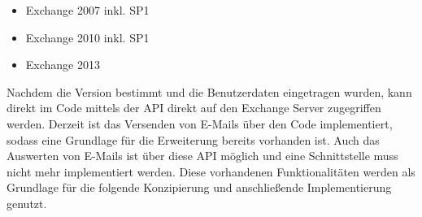 \begin{itemize}[topsep=-0.5\parskip]
\item Exchange 2007 inkl. SP1
\item  Exchange 2010 inkl. SP1
\item  Exchange 2013 
\end{itemize}

\noindent
Nachdem die Version bestimmt und die Benutzerdaten eingetragen wurden, kann direkt im Code mittels der API direkt auf den Exchange Server zugegriffen werden. Derzeit ist das Versenden von E-Mails über den Code implementiert, sodass eine Grundlage für die Erweiterung bereits vorhanden ist. Auch das Auswerten von E-Mails ist über diese API möglich und eine Schnittstelle muss nicht mehr implementiert werden. Diese vorhandenen Funktionalitäten werden als Grundlage für die folgende Konzipierung und anschließende Implementierung genutzt. 

